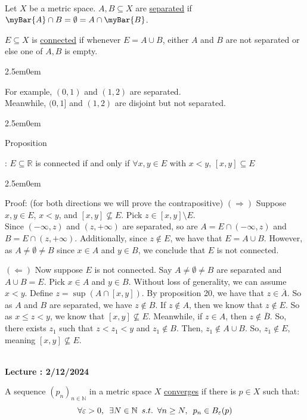 \documentclass{book}
\newcommand{\hTwo}{%
   \color{MidnightBlue}%
   \fontsize{13}{15}\selectfont%
}
\newcommand{\hThree}{%
   \color{PineGreen}
   \fontsize{13}{15}\selectfont%
}
\newcommand{\exOne}{%
   \color{Purple}%
   \fontsize{14}{16}\selectfont%
}
\newenvironment{myIndent}{%
   \begin{adjustwidth}{2.5em}{0em}%
}{%
   \end{adjustwidth}%
}
\newcommand{\udefine}[1]{%
   \setulcolor{Red}%
   \setul{0.14em}{0.07em}%
   \ul{#1}%
}
\newcommand{\retTwo}{\hfill\bigbreak}
\newcounter{LectureNumber}
\newcommand*{\markLecture}[1]{%
   \stepcounter{LectureNumber}%
   {\huge \color{Black} \textbf{Lecture \theLectureNumber: #1} \newline}%
}
\newcommand{\suchthat}{ \hspace{0.5em}s.t.\hspace{0.5em}}
\newcounter{PropNumber}
\newcommand{\propCount}[1][1]{%
   \addtocounter{PropNumber}{#1}%
   \thePropNumber%
}
\newcommand{\mySepTwo}[1][.]{%
   {\noindent\color{#1}{\rule{6.5in}{0.5mm}}}\\%
}
\begin{document}
   \mySepTwo

   Let $X$ be a metric space. $A, B \subseteq X$ are \udefine{separated} if $\myBar{A} \cap B = \emptyset = A \cap \myBar{B}$. \retTwo

   $E \subseteq X$ is \udefine{connected} if whenever $E = A \cup B$, either $A$ and $B$ are not separated or else one of $A, B$ is empty.
   {\begin{myIndent} \exOne
      For example, $(0, 1)$ and $(1, 2)$ are separated.\\
      Meanwhile, $(0, 1]$ and $(1, 2)$ are disjoint but not separated. \retTwo
   \end{myIndent}}
   
   {\begin{myIndent} \hTwo
      Proposition \propCount: $E \subseteq \mathbb{R}$ is connected if and only if $\forall x, y \in E$ with $x<y$, $[x, y] \subseteq E$
      
      {\begin{myIndent} \hThree
         Proof: (for both directions we will prove the contrapositive)\retTwo
         $(\Longrightarrow)$ Suppose $x, y \in E$, $x < y$, and $[x,y]\nsubseteq E$. Pick $z \in [x,y]\setminus E$.\\
         Since $(-\infty, z)$ and $(z, +\infty)$ are separated, so are $A = E \cap (-\infty, z)$ and $B = E \cap (z, +\infty)$. Additionally, since $z \notin E$, we have that $E = A \cup B$. However, as $A \neq \emptyset \neq B$ since $x \in A$ and $y \in B$, we conclude that $E$ is not connected. \retTwo

         $(\Longleftarrow)$ Now suppose $E$ is not connected. Say $A \neq \emptyset \neq B$ are separated and $A \cup B = E$. Pick $x \in A$ and $y \in B$. Without loss of generality, we can assume $x < y$. Define $z = \sup{(A \cap [x, y])}$. By proposition 20, we have that $z \in \overbar{A}$. So as $A$ and $B$ are separated, we have $z \notin B$.  \retTwo
         If $z \notin A$, then we know that $z \notin E$. So as $x \leq z < y$, we know that $[x, y] \nsubseteq E$. Meanwhile, if $z \in A$, then $z \notin \overbar{B}$. So, there exists $z_1$ such that $z < z_1 < y$ and $z_1 \notin B$. Then, $z_1 \notin A \cup B$. So, $z_1 \notin E$, meaning $[x, y] \nsubseteq E$.
      \end{myIndent}}
   \end{myIndent}}

   \mySepTwo

   \markLecture{2/12/2024}

   A sequence $(p_n)_{n \in \mathbb{N}}$ in a metric space $X$ \udefine{converges} if there is $p \in X$ such that:
   \[\forall \varepsilon > 0, \hspace{0.5em} \exists N \in \mathbb{N} \suchthat \forall n \geq N, \hspace{0.5em} p_n \in B_\varepsilon(p)\]
\end{document}
